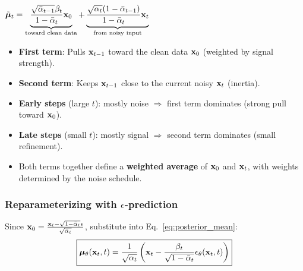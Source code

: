 \begin{keybox}
$\tilde{\boldsymbol{\mu}}_t = \underbrace{\frac{\sqrt{\bar\alpha_{t-1}}\beta_t}{1-\bar\alpha_t}\mathbf{x}_0}_{\text{toward clean data}} + \underbrace{\frac{\sqrt{\alpha_t}(1-\bar\alpha_{t-1})}{1-\bar\alpha_t}\mathbf{x}_t}_{\text{from noisy input}}$

\begin{itemize}
\item \textbf{First term}: Pulls $\mathbf{x}_{t-1}$ toward the clean data $\mathbf{x}_0$ (weighted by signal strength).
\item \textbf{Second term}: Keeps $\mathbf{x}_{t-1}$ close to the current noisy $\mathbf{x}_t$ (inertia).
\item \textbf{Early steps} (large $t$): mostly noise $\Rightarrow$ first term dominates (strong pull toward $\mathbf{x}_0$).
\item \textbf{Late steps} (small $t$): mostly signal $\Rightarrow$ second term dominates (small refinement).
\item Both terms together define a \textbf{weighted average} of $\mathbf{x}_0$ and $\mathbf{x}_t$, with weights determined by the noise schedule.
\end{itemize}
\end{keybox}

\subsubsection{Reparameterizing with $\epsilon$-prediction}
Since $\mathbf{x}_0 = \frac{\mathbf{x}_t - \sqrt{1-\bar\alpha_t}\epsilon}{\sqrt{\bar\alpha_t}}$, substitute into Eq.~\ref{eq:posterior_mean}:
\begin{equation}\label{eq:mu_epsilon}
\boxed{\boldsymbol{\mu}_\theta(\mathbf{x}_t, t) = \frac{1}{\sqrt{\alpha_t}}\left(\mathbf{x}_t - \frac{\beta_t}{\sqrt{1-\bar\alpha_t}}\epsilon_\theta(\mathbf{x}_t, t)\right)}
\end{equation}

